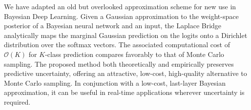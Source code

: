 
We have adapted an old but overlooked approximation scheme for new use in Bayesian Deep Learning. Given a Gaussian approximation to the weight-space posterior of a Bayesian neural network and an input, the Laplace Bridge analytically maps the marginal Gaussian prediction on the logits onto a Dirichlet distribution over the softmax vectors. The associated computational cost of $\mathcal{O}(K)$ for $K$-class prediction compares favorably to that of Monte Carlo sampling.
The proposed method both theoretically and empirically preserves predictive uncertainty, offering an attractive, low-cost, high-quality alternative to Monte Carlo sampling. In conjunction with a low-cost, last-layer Bayesian approximation, it can be useful in real-time applications wherever uncertainty is required.
